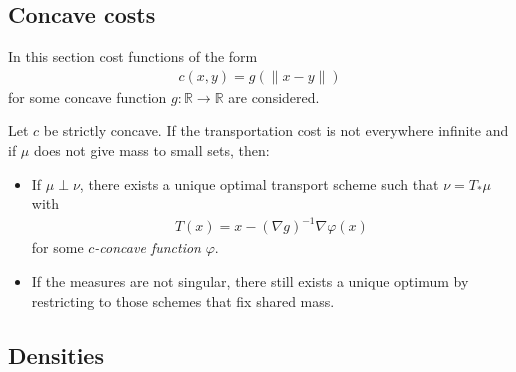 \subsection{Concave costs}

    In this section cost functions of the form
    \begin{gather}
        c(x,y) = g(\|x-y\|)
    \end{gather}
    for some concave function $g:\mathbb{R}\rightarrow\mathbb{R}$ are considered.

    \begin{property}
        Let $c$ be strictly concave. If the transportation cost is not everywhere infinite and if $\mu$ does not give mass to small sets, then:
        \begin{itemize}
            \item If $\mu\perp\nu$, there exists a unique optimal transport scheme such that $\nu = T_\ast\mu$ with
            \begin{gather}
                T(x) = x - (\nabla g)^{-1}\nabla\varphi(x)
            \end{gather}
            for some \textit{$c$-concave function} $\varphi$.
            \item If the measures are not singular, there still exists a unique optimum by restricting to those schemes that fix shared mass.
        \end{itemize}
    \end{property}

\subsection{Densities}

